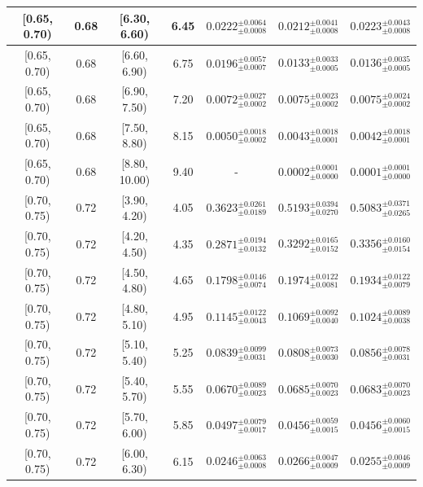 \begin{longtable}{|c|c|c|c|c|c|c|}
\hline
[0.65, 0.70) & 0.68 & [6.30, 6.60) & 6.45 & $0.0222^{ \pm 0.0064 }_{ \pm 0.0008 }$ & $0.0212^{ \pm 0.0041 }_{ \pm 0.0008 }$ & $0.0223^{ \pm 0.0043 }_{ \pm 0.0008 }$ \\ 
\hline
[0.65, 0.70) & 0.68 & [6.60, 6.90) & 6.75 & $0.0196^{ \pm 0.0057 }_{ \pm 0.0007 }$ & $0.0133^{ \pm 0.0033 }_{ \pm 0.0005 }$ & $0.0136^{ \pm 0.0035 }_{ \pm 0.0005 }$ \\ 
\hline
[0.65, 0.70) & 0.68 & [6.90, 7.50) & 7.20 & $0.0072^{ \pm 0.0027 }_{ \pm 0.0002 }$ & $0.0075^{ \pm 0.0023 }_{ \pm 0.0002 }$ & $0.0075^{ \pm 0.0024 }_{ \pm 0.0002 }$ \\ 
\hline
[0.65, 0.70) & 0.68 & [7.50, 8.80) & 8.15 & $0.0050^{ \pm 0.0018 }_{ \pm 0.0002 }$ & $0.0043^{ \pm 0.0018 }_{ \pm 0.0001 }$ & $0.0042^{ \pm 0.0018 }_{ \pm 0.0001 }$ \\ 
\hline
[0.65, 0.70) & 0.68 & [8.80, 10.00) & 9.40 & - & $0.0002^{ \pm 0.0001 }_{ \pm 0.0000 }$ & $0.0001^{ \pm 0.0001 }_{ \pm 0.0000 }$ \\ 
\hline
[0.70, 0.75) & 0.72 & [3.90, 4.20) & 4.05 & $0.3623^{ \pm 0.0261 }_{ \pm 0.0189 }$ & $0.5193^{ \pm 0.0394 }_{ \pm 0.0270 }$ & $0.5083^{ \pm 0.0371 }_{ \pm 0.0265 }$ \\ 
\hline
[0.70, 0.75) & 0.72 & [4.20, 4.50) & 4.35 & $0.2871^{ \pm 0.0194 }_{ \pm 0.0132 }$ & $0.3292^{ \pm 0.0165 }_{ \pm 0.0152 }$ & $0.3356^{ \pm 0.0160 }_{ \pm 0.0154 }$ \\ 
\hline
[0.70, 0.75) & 0.72 & [4.50, 4.80) & 4.65 & $0.1798^{ \pm 0.0146 }_{ \pm 0.0074 }$ & $0.1974^{ \pm 0.0122 }_{ \pm 0.0081 }$ & $0.1934^{ \pm 0.0122 }_{ \pm 0.0079 }$ \\ 
\hline
[0.70, 0.75) & 0.72 & [4.80, 5.10) & 4.95 & $0.1145^{ \pm 0.0122 }_{ \pm 0.0043 }$ & $0.1069^{ \pm 0.0092 }_{ \pm 0.0040 }$ & $0.1024^{ \pm 0.0089 }_{ \pm 0.0038 }$ \\ 
\hline
[0.70, 0.75) & 0.72 & [5.10, 5.40) & 5.25 & $0.0839^{ \pm 0.0099 }_{ \pm 0.0031 }$ & $0.0808^{ \pm 0.0073 }_{ \pm 0.0030 }$ & $0.0856^{ \pm 0.0078 }_{ \pm 0.0031 }$ \\ 
\hline
[0.70, 0.75) & 0.72 & [5.40, 5.70) & 5.55 & $0.0670^{ \pm 0.0089 }_{ \pm 0.0023 }$ & $0.0685^{ \pm 0.0070 }_{ \pm 0.0023 }$ & $0.0683^{ \pm 0.0070 }_{ \pm 0.0023 }$ \\ 
\hline
[0.70, 0.75) & 0.72 & [5.70, 6.00) & 5.85 & $0.0497^{ \pm 0.0079 }_{ \pm 0.0017 }$ & $0.0456^{ \pm 0.0059 }_{ \pm 0.0015 }$ & $0.0456^{ \pm 0.0060 }_{ \pm 0.0015 }$ \\ 
\hline
[0.70, 0.75) & 0.72 & [6.00, 6.30) & 6.15 & $0.0246^{ \pm 0.0063 }_{ \pm 0.0008 }$ & $0.0266^{ \pm 0.0047 }_{ \pm 0.0009 }$ & $0.0255^{ \pm 0.0046 }_{ \pm 0.0009 }$ \\ 

\end{longtable}
